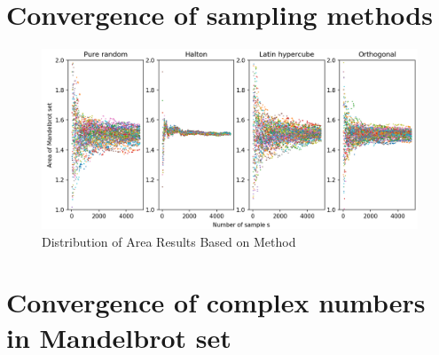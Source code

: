 \documentclass{article}
\begin{document}
    \appendix
    \appendixpage

    \section{Convergence of sampling methods}
    \label{appendix:convergence_sampling_methods}

    \begin{figure}[h]
        \centering
        \includegraphics[width=\linewidth]{pictures/appendix/area_spread.png}
        \caption{Distribution of Area Results Based on Method}
        \label{fig:area_spread}
    \end{figure}

    \clearpage

    \section{Convergence of complex numbers in Mandelbrot set}
    \label{appendix:convergence_c}
\end{document}
